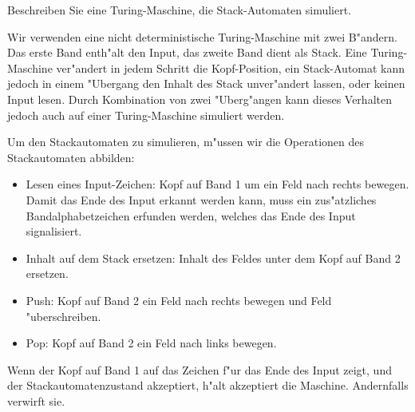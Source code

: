 Beschreiben Sie eine Turing-Maschine, die Stack-Automaten simuliert.

\begin{loesung}
Wir verwenden eine nicht deterministische Turing-Maschine mit zwei B"andern.
Das erste Band
enth"alt den Input, das zweite Band dient als Stack. Eine Turing-Maschine
ver"andert in jedem Schritt die Kopf-Position, ein Stack-Automat kann
jedoch in einem "Ubergang den Inhalt des Stack unver"andert lassen,
oder keinen Input lesen. Durch Kombination von zwei "Uberg"angen
kann dieses Verhalten jedoch auch auf einer Turing-Maschine simuliert
werden.

Um den Stackautomaten zu simulieren, m"ussen wir die Operationen des
Stackautomaten abbilden:
\begin{itemize}
\item Lesen eines Input-Zeichen: Kopf auf Band 1 um ein Feld nach
rechts bewegen. Damit das Ende des Input erkannt werden kann, muss ein
zus"atzliches Bandalphabetzeichen erfunden werden, welches das Ende
des Input signalisiert.
\item Inhalt auf dem Stack ersetzen: Inhalt des Feldes unter dem Kopf
auf Band 2 ersetzen.
\item Push: Kopf auf Band 2 ein Feld nach rechts bewegen und Feld "uberschreiben.
\item Pop: Kopf auf Band 2 ein Feld nach links bewegen.
\end{itemize}
Wenn der Kopf auf Band 1 auf das Zeichen f"ur das Ende des Input zeigt,
und der Stackautomatenzustand akzeptiert, h"alt akzeptiert die Maschine.
Andernfalls verwirft sie.
\end{loesung}
